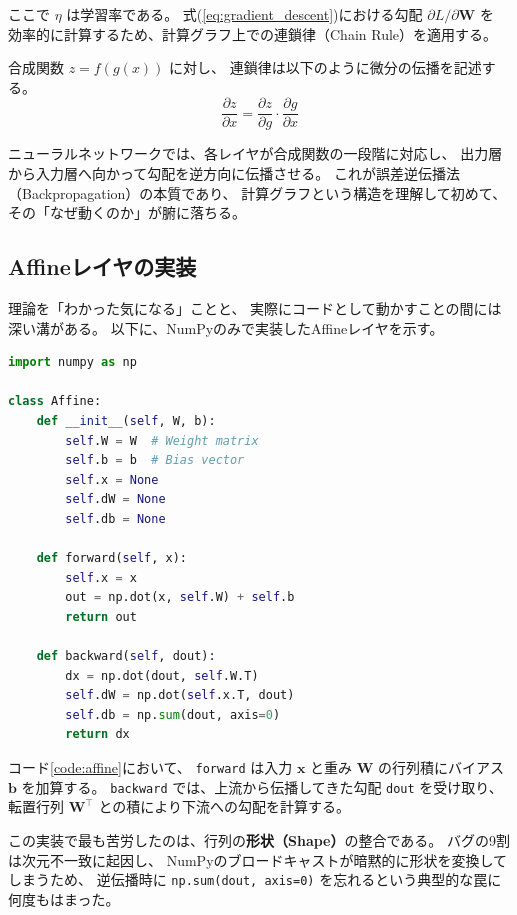 \documentclass[uplatex, dvipdfmx, a4paper, 11pt]{jsarticle}
\begin{document}
ここで $\eta$ は学習率である。
式(\ref{eq:gradient_descent})における勾配 $\partial L / \partial \bm{W}$ を
効率的に計算するため、計算グラフ上での連鎖律（Chain Rule）を適用する。

合成関数 $z = f(g(x))$ に対し、
連鎖律は以下のように微分の伝播を記述する。
\begin{equation}
    \frac{\partial z}{\partial x} = \frac{\partial z}{\partial g} \cdot \frac{\partial g}{\partial x}
    \label{eq:chain_rule}
\end{equation}

ニューラルネットワークでは、各レイヤが合成関数の一段階に対応し、
出力層から入力層へ向かって勾配を逆方向に伝播させる。
これが誤差逆伝播法（Backpropagation）の本質であり、
計算グラフという構造を理解して初めて、
その「なぜ動くのか」が腑に落ちる。

\subsection{Affineレイヤの実装}
理論を「わかった気になる」ことと、
実際にコードとして動かすことの間には深い溝がある。
以下に、NumPyのみで実装したAffineレイヤを示す。

\begin{lstlisting}[language=Python, caption=Affine Layer Implementation, label=code:affine]
import numpy as np

class Affine:
    def __init__(self, W, b):
        self.W = W  # Weight matrix
        self.b = b  # Bias vector
        self.x = None
        self.dW = None
        self.db = None

    def forward(self, x):
        self.x = x
        out = np.dot(x, self.W) + self.b
        return out

    def backward(self, dout):
        dx = np.dot(dout, self.W.T)
        self.dW = np.dot(self.x.T, dout)
        self.db = np.sum(dout, axis=0)
        return dx
\end{lstlisting}

コード\ref{code:affine}において、
\texttt{forward} は入力 $\bm{x}$ と重み $\bm{W}$ の行列積にバイアス $\bm{b}$ を加算する。
\texttt{backward} では、上流から伝播してきた勾配 \texttt{dout} を受け取り、
転置行列 $\bm{W}^\top$ との積により下流への勾配を計算する。

この実装で最も苦労したのは、行列の\textbf{形状（Shape）}の整合である。
バグの9割は次元不一致に起因し、
NumPyのブロードキャストが暗黙的に形状を変換してしまうため、
逆伝播時に \texttt{np.sum(dout, axis=0)} を忘れるという典型的な罠に何度もはまった。
\end{document}
